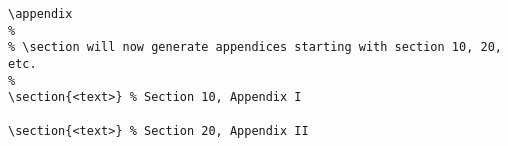 \begin{itemize}
\begin{small}
\begin{verbatim}
\appendix
%
% \section will now generate appendices starting with section 10, 20, etc.
%
\section{<text>} % Section 10, Appendix I

\section{<text>} % Section 20, Appendix II


\end{verbatim}
\end{small}

\end{itemize}


